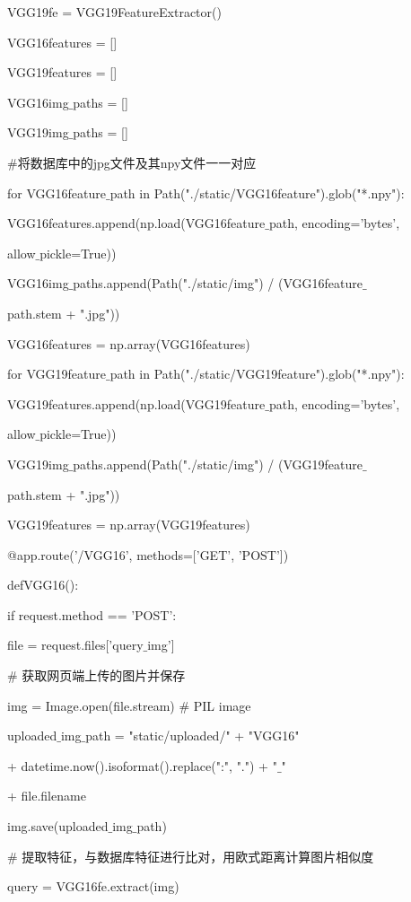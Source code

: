 \documentclass[bachelor_p]{hdu-thesis}
\begin{document}
VGG19fe = VGG19FeatureExtractor()

VGG16features = []

VGG19features = []

VGG16img$\_$paths = []

VGG19img$\_$paths = []

\qquad \qquad $\#$将数据库中的jpg文件及其npy文件一一对应

for VGG16feature$\_$path in Path("./static/VGG16feature").glob("*.npy"):

\qquad VGG16features.append(np.load(VGG16feature$\_$path, encoding='bytes',

\qquad allow$\_$pickle=True))

\qquad VGG16img$\_$paths.append(Path("./static/img") / (VGG16feature$\_$

\qquad path.stem + ".jpg"))

VGG16features = np.array(VGG16features)

for VGG19feature$\_$path in Path("./static/VGG19feature").glob("*.npy"):

\qquad VGG19features.append(np.load(VGG19feature$\_$path, encoding='bytes', 

\qquad allow$\_$pickle=True))

\qquad VGG19img$\_$paths.append(Path("./static/img") / (VGG19feature$\_$

\qquad path.stem + ".jpg"))

VGG19features = np.array(VGG19features)

@app.route('/VGG16', methods=['GET', 'POST'])

def\quad VGG16():

\qquad if request.method == 'POST':

\qquad \qquad file = request.files['query$\_$img']

\qquad \qquad $\#$ 获取网页端上传的图片并保存

\qquad \qquad img = Image.open(file.stream)  $\#$ PIL image

\qquad \qquad uploaded$\_$img$\_$path = "static/uploaded/" + "VGG16"

\qquad \qquad + datetime.now().isoformat().replace(":", ".") + "$\_$"

\qquad \qquad + file.filename

\qquad \qquad img.save(uploaded$\_$img$\_$path)

\qquad \qquad $\#$ 提取特征，与数据库特征进行比对，用欧式距离计算图片相似度

\qquad \qquad query = VGG16fe.extract(img)
\end{document}
